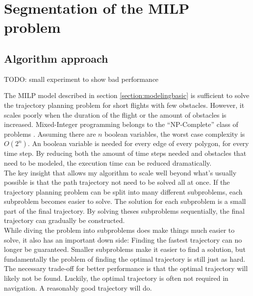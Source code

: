 \chapter{Segmentation of the MILP problem}
\label{section:segment}
\section{Algorithm approach}
TODO: small experiment to show bad performance
\par
The MILP model described in section \ref{section:modelingbasic} is sufficient to solve the trajectory planning problem for short flights with few obstacles. However, it scales poorly when the duration of the flight or the amount of obstacles is increased. Mixed-Integer programming belongs to the ``NP-Complete'' class of problems \cite{DBLP:conf/coco/Karp72}. Assuming there are $n$ boolean variables, the worst case complexity is $O(2^n)$. An boolean variable is needed for every edge of every polygon, for every time step. By reducing both the amount of time steps needed and obstacles that need to be modeled, the execution time can be reduced dramatically. \\
The key insight that allows my algorithm to scale well beyond what's usually possible is that the path trajectory not need to be solved all at once. If the trajectory planning problem can be split into many different subproblems, each subproblem becomes easier to solve. The solution for each subproblem is a small part of the final trajectory. By solving theses subproblems sequentially, the final trajectory can gradually be constructed. \\
While diving the problem into subproblems does make things much easier to solve, it also has an important down side: Finding the fastest trajectory can no longer be guaranteed. Smaller subproblems make it easier to find a solution, but fundamentally the problem of finding the optimal trajectory is still just as hard. The necessary trade-off for better performance is that the optimal trajectory will likely not be found. Luckily, the optimal trajectory is often not required in navigation. A reasonably good trajectory will do.

